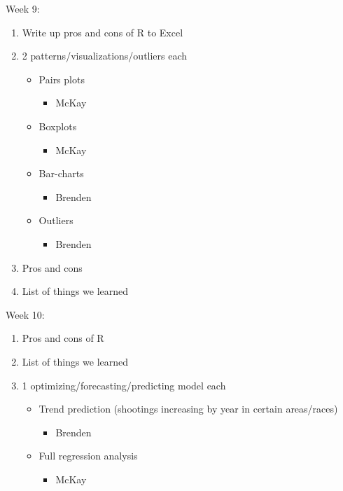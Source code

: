 \documentclass[]{article}
\providecommand{\tightlist}{%
  \setlength{\itemsep}{0pt}\setlength{\parskip}{0pt}}
\begin{document}
Week 9:

\begin{enumerate}
\def\labelenumi{\arabic{enumi}.}
\tightlist
\item
  Write up pros and cons of R to Excel
\item
  2 patterns/visualizations/outliers each

  \begin{itemize}
  \tightlist
  \item
    Pairs plots

    \begin{itemize}
    \tightlist
    \item
      McKay
    \end{itemize}
  \item
    Boxplots

    \begin{itemize}
    \tightlist
    \item
      McKay
    \end{itemize}
  \item
    Bar-charts

    \begin{itemize}
    \tightlist
    \item
      Brenden
    \end{itemize}
  \item
    Outliers

    \begin{itemize}
    \tightlist
    \item
      Brenden
    \end{itemize}
  \end{itemize}
\item
  Pros and cons
\item
  List of things we learned
\end{enumerate}

Week 10:

\begin{enumerate}
\def\labelenumi{\arabic{enumi}.}
\tightlist
\item
  Pros and cons of R
\item
  List of things we learned
\item
  1 optimizing/forecasting/predicting model each

  \begin{itemize}
  \tightlist
  \item
    Trend prediction (shootings increasing by year in certain
    areas/races)

    \begin{itemize}
    \tightlist
    \item
      Brenden
    \end{itemize}
  \item
    Full regression analysis

    \begin{itemize}
    \tightlist
    \item
      McKay
    \end{itemize}
  \end{itemize}
\end{enumerate}
\end{document}
